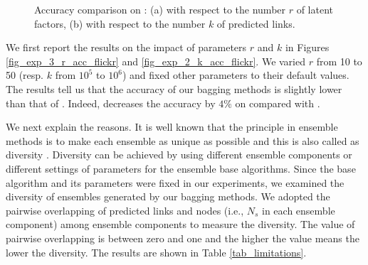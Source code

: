\begin{figure}[tb!]
  \centering
  \vspace{1ex}
  \hspace{-2ex}
  \vspace{-2ex}
  \caption{Accuracy comparison on \Flickr: (a) with respect to the number $r$ of latent factors,
  (b) with respect to the number $k$ of predicted links.}\label{fig_exp_5}
  \vspace{-1ex}
\end{figure}

We first report the results on the impact of parameters $r$ and $k$
in Figures \ref{fig_exp_3_r_acc_flickr} and \ref{fig_exp_2_k_acc_flickr}.
We varied $r$ from 10 to 50 (resp. $k$ from $10^5$ to $10^6$)
and fixed other parameters to their default values. The results tell us that
the accuracy of our bagging methods is slightly lower than that of \NMF.
Indeed, \Biased decreases the accuracy by $4\%$ on \Flickr compared with \NMF.

We next explain the reasons. It is well known that the principle in ensemble methods is to make each ensemble as
unique as possible and this is also called as diversity \cite{zhzhou}. Diversity can
be achieved by using different ensemble components or different settings of parameters for the ensemble base
algorithms. Since the base algorithm and its parameters were fixed in our experiments, we examined
the diversity of ensembles generated by our bagging methods. We adopted the pairwise
overlapping of predicted links and nodes (i.e., $N_s$ in each ensemble component)
among ensemble components to measure the diversity. The value of pairwise overlapping is between
zero and one and the higher the value means the lower the diversity.
The results are shown in Table \ref{tab_limitations}.

